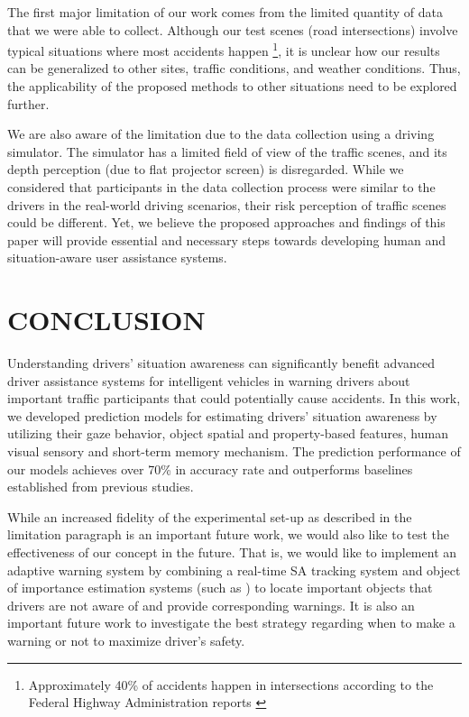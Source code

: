 \documentclass[letterpaper, 10 pt, conference]{ieeeconf}  %
\begin{document}
The first major limitation of our work comes from the limited quantity of data that we were able to collect. Although our test scenes (road intersections) involve typical situations where most accidents happen \footnote{Approximately 40\% of accidents happen in intersections according to the Federal Highway Administration reports \cite{NHTSA2016b}}, it is unclear how our results can be generalized to other sites, traffic conditions, and weather conditions. Thus, the applicability of the proposed methods to other situations need to be explored further.

We are also aware of the limitation due to the data collection using a driving simulator. The simulator has a limited field of view of the traffic scenes, and its depth perception (due to flat projector screen) is disregarded. While we considered that participants in the data collection process were similar to the drivers in the real-world driving scenarios, their risk perception of traffic scenes could be different. Yet, we believe the proposed approaches and findings of this paper will provide essential and necessary steps towards developing human and situation-aware user assistance systems.


\section{CONCLUSION}

Understanding drivers' situation awareness can significantly benefit advanced driver assistance systems for intelligent vehicles in warning drivers about important traffic participants that could potentially cause accidents. In this work, we developed prediction models for estimating drivers' situation awareness by utilizing their gaze behavior, object spatial and property-based features, human visual sensory and short-term memory mechanism. The prediction performance of our models achieves over 70\% in accuracy rate and outperforms baselines established from previous studies.

While an increased fidelity of the experimental set-up as described in the limitation paragraph is an important future work, we would also like to test the effectiveness of our concept in the future. That is, we would like to implement an adaptive warning system by combining a real-time SA tracking system and object of importance estimation systems (such as \cite{martin2018object}) to locate important objects that drivers are not aware of and provide corresponding warnings. It is also an important future work to investigate the best strategy regarding when to make a warning or not to maximize driver's safety.
\end{document}
